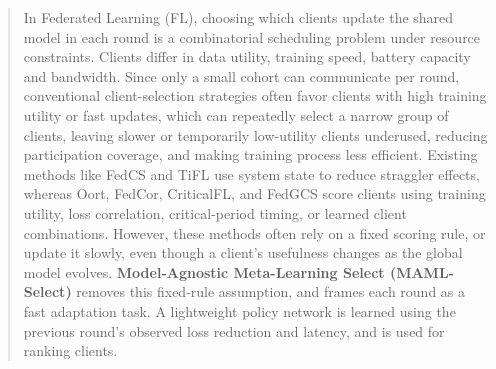 \documentclass[journal]{IEEEtran}
\theoremstyle{remark}
\newcommand{\revision}[1]{#1}
\begin{document}
\begin{abstract}
\revision{In Federated Learning (FL), choosing which clients update the shared model in each round is a combinatorial scheduling problem under resource constraints. Clients differ in data utility, training speed, battery capacity and bandwidth. Since only a small cohort can communicate per round, conventional client-selection strategies often favor clients with high training utility or fast updates, which can repeatedly select a narrow group of clients, leaving slower or temporarily low-utility clients underused, reducing participation coverage, and making training process less efficient. Existing methods like FedCS and TiFL use system state to reduce straggler effects, whereas Oort, FedCor, CriticalFL, and FedGCS score clients using training utility, loss correlation, critical-period timing, or learned client combinations. However, these methods often rely on a fixed scoring rule, or update it slowly, even though a client’s usefulness changes as the global model evolves. \textbf{Model-Agnostic Meta-Learning Select (MAML-Select)} removes this fixed-rule assumption, and frames each round as a fast adaptation task. A lightweight policy network is learned using the previous round’s observed loss reduction and latency, and is used for ranking clients. %
}
\end{abstract}
\end{document}
